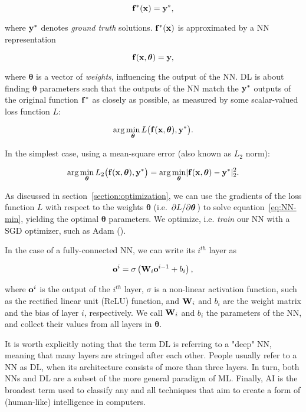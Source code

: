 $$\vb{f}^*(\vb{x}) = \vb{y}^*,$$

where $\vb{y}^*$ denotes \textit{ground truth} solutions. $\vb{f}^*(\vb{x})$ is
approximated by a \acf{NN} representation 

$$\vb{f}(\vb{x}, \boldsymbol\theta) = \vb{y},$$

where $\boldsymbol{\theta}$ is a vector of \textit{weights}, influencing the output of
the \ac{NN}. \ac{DL} is about finding $\boldsymbol{\theta}$ parameters such
that the outputs of the \ac{NN} match the $\vb{y}^*$ outputs of the original
function $\vb{f}^*$ as closely as possible, as measured by some scalar-valued
loss function $L$:

$$\arg\min_{\boldsymbol\theta} L\big(\vb{f}(\vb{x}, \boldsymbol\theta), \vb{y}^*
    \big).$$

In the simplest case, using a mean-square error (also known as $L_2$
norm):

\begin{equation}\label{eq:NN-min}
    \arg\min_{\boldsymbol\theta} 
        L_2\big(\vb{f}(\vb{x}, \boldsymbol\theta), \vb{y}^* \big) 
    = \arg\min_{\boldsymbol\theta} 
        \lvert \vb{f}(\vb{x}, \boldsymbol\theta) - \vb{y}^* \rvert_2^2.
\end{equation}

As discussed in section~\ref{section:optimization}, we can use the
gradients of the loss function $L$ with respect to the weights
$\boldsymbol{\theta}$ (i.e. $\pdv*{L}{\boldsymbol\theta}$) to solve
equation~\eqref{eq:NN-min}, yielding the optimal $\boldsymbol{\theta}$
parameters. We optimize, i.e. \textit{train} our \ac{NN} with a \acf{SGD}
optimizer, such as Adam (\cite{adam}).

In the case of a fully-connected \ac{NN}, we can write its $i^{th}$ layer as 

\begin{equation}\label{nn-single-layer-math}
    \vb{o}^i = \sigma\left(\vb{W}_i \vb{o}^{i-1} + b_i\right),
\end{equation}

where $\vb{o}^i$ is the output of the $i^{th}$ layer, $\sigma$ is a non-linear
activation function, such as the rectified linear unit (ReLU) function, and
$\vb{W}_i$ and $b_i$ are the weight matrix and the bias of layer $i$,
respectively. We call $\vb{W}_i$ and $b_i$ the parameters of the \ac{NN},
and collect their values from all layers in $\boldsymbol\theta$.

It is worth explicitly noting that the term \acf{DL} is referring to a "deep"
\acf{NN}, meaning that many layers are stringed after each other. People usually
refer to a \ac{NN} as \ac{DL}, when its architecture consists of more than three
layers. In turn, both \acp{NN} and \ac{DL} are a subset of the more general
paradigm of \acf{ML}. Finally, \acf{AI} is the broadest term used to classify
any and all techniques that aim to create a form of (human-like) intelligence in
computers.

